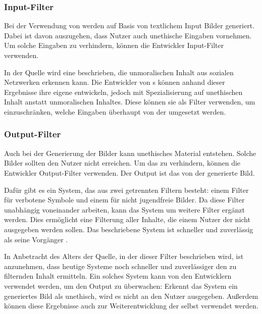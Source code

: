 \documentclass[hidelinks,12pt]{report}
\begin{document}
\subsubsection{Input-Filter}
Bei der Verwendung von  werden auf Basis von textlichem Input Bilder generiert. Dabei ist davon auszugehen, dass Nutzer auch unethische Eingaben vornehmen. Um solche Eingaben zu verhindern, können die Entwickler Input-Filter verwenden. 

In der Quelle \cite[Artificial Intelligence as a Service for Immoral ContentDetection and Eradication]{Shah} wird eine  beschrieben, die unmoralischen Inhalt aus sozialen Netzwerken erkennen kann. Die Entwickler von s können anhand dieser Ergebnisse ihre eigene  entwickeln, jedoch mit Spezialisierung auf unethischen Inhalt anstatt unmoralischen Inhaltes. Diese  können sie als Filter verwenden, um einzuschränken, welche Eingaben überhaupt von der  umgesetzt werden.

\subsubsection{Output-Filter}
Auch bei der Generierung der Bilder kann unethisches Material entstehen. Solche Bilder sollten den Nutzer nicht erreichen. Um das zu verhindern, können die Entwickler Output-Filter verwenden. Der Output ist das von der  generierte Bild.

Dafür gibt es ein System, das aus zwei getrennten Filtern besteht: einem Filter für verbotene Symbole und einem für nicht jugendfreie Bilder\cite{Zheng}. Da diese Filter unabhängig voneinander arbeiten, kann das System um weitere Filter ergänzt werden. Dies ermöglicht eine Filterung aller Inhalte, die einem Nutzer der  nicht ausgegeben werden sollen. Das beschriebene System ist schneller und zuverlässig als seine Vorgänger \cite{Zheng}.

In Anbetracht des Alters der Quelle, in der dieser Filter beschrieben wird, ist anzunehmen, dass heutige Systeme noch schneller und zuverlässiger den zu filternden Inhalt ermitteln. Ein solches System kann von den Entwicklern verwendet werden, um den Output zu überwachen: Erkennt das System ein generiertes Bild als unethisch, wird es nicht an den Nutzer ausgegeben. Außerdem können diese Ergebnisse auch zur Weiterentwicklung der  selbst verwendet werden.
\end{document}
